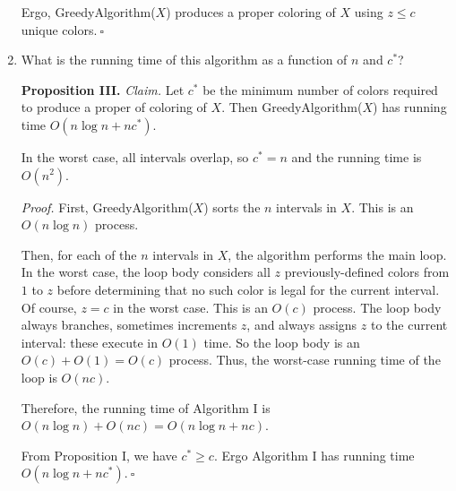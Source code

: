 \begin{enumerate}
\begin{solution}
Ergo, {\sc GreedyAlgorithm}($X$) produces a proper coloring of $X$ using $z\leq c$ unique colors.$~\square$
\end{solution}
\newpage
\item What is the running time of this algorithm as a function of $n$ and $c^*$?
\begin{solution}
\textbf{Proposition III. }\textit{Claim. } Let $c^*$ be the minimum number of colors required to produce a proper of coloring of $X$. Then {\sc GreedyAlgorithm}($X$) has running time $O(n\log n+nc^*)$.

In the worst case, all intervals overlap, so $c^*=n$ and the running time is $O(n^2)$.

\textit{Proof. }First, {\sc GreedyAlgorithm}($X$) sorts the $n$ intervals in $X$. This is an $O(n\log n)$ process.

Then, for each of the $n$ intervals in $X$, the algorithm performs the main loop. In the worst case, the loop body considers all $z$ previously-defined colors from $1$ to $z$ before determining that no such color is legal for the current interval. Of course, $z=c$ in the worst case. This is an $O(c)$ process. The loop body always branches, sometimes increments $z$, and always assigns $z$ to the current interval: these execute in $O(1)$ time. So the loop body is an $O(c)+O(1)=O(c)$ process. Thus, the worst-case running time of the loop is $O(nc)$.

Therefore, the running time of Algorithm I is $O(n\log n)+O(nc)=O(n\log n+nc)$.

From Proposition I, we have $c^*\geq c$. Ergo Algorithm I has running time $O(n\log n+nc^*).~\square$
\end{solution}
\end{enumerate}
